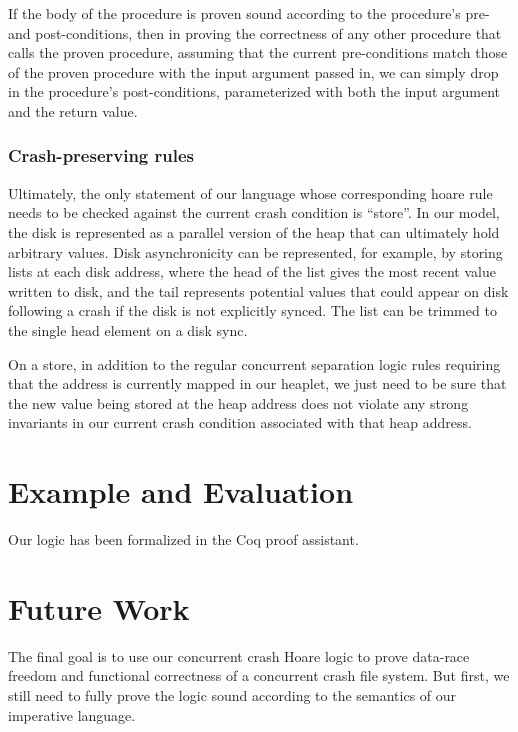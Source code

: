 If the body of the procedure is proven sound according to the procedure's pre-
and post-conditions, then in proving the correctness of any other procedure that calls
the proven procedure, assuming that the current pre-conditions
match those of the proven procedure with the input argument passed in,
we can simply drop in the procedure's post-conditions, parameterized with both
the input argument and the return value.

\subsubsection{Crash-preserving rules}


Ultimately, the only statement of our language whose corresponding hoare rule
needs to be checked against the current crash condition is ``store''. In our
model, the disk is represented as a parallel version of the heap that can
ultimately hold arbitrary values. Disk asynchronicity can be represented, for
example, by storing lists at each disk address, where the head of the list gives
the most recent value written to disk, and the tail represents potential values
that could appear on disk following a crash if the disk is not explicitly synced.
The list can be trimmed to the single head element on a disk sync.

On a store, in addition to the regular concurrent separation logic rules
requiring that the address is currently mapped in our heaplet, we just need to
be sure that the new value being stored at the heap address does not violate any
strong invariants in our current crash condition associated with that heap
address.

\section{Example and Evaluation}

Our logic has been formalized in the Coq proof assistant.


\section{Future Work}


The final goal is to use our concurrent crash Hoare logic to prove data-race
freedom and functional correctness of a concurrent crash file system. But first,
we still need to fully prove the logic sound according to the semantics of our
imperative language.

